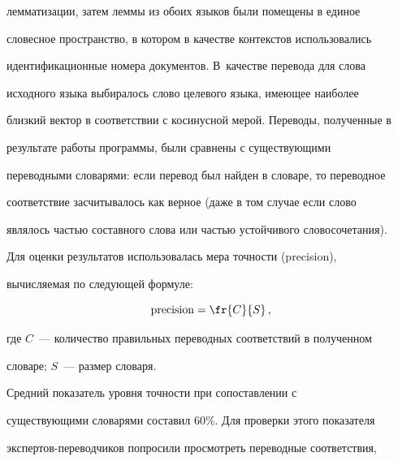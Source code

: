лемматизации, затем леммы из обоих языков были помещены в единое


словесное пространство, в котором в качестве контекстов использовались


идентификационные номера документов. В~качестве перевода для слова


исходного языка выбиралось слово целевого языка, име\-ющее наиболее


близкий вектор в соответствии с косинусной мерой. Переводы, полученные в


результате работы программы, были сравнены с существующими


переводными словарями: если перевод был найден в словаре, то переводное


соответствие засчитывалось как верное (даже в том случае если слово


являлось частью составного слова или частью устойчивого словосочетания).


Для оценки результатов использовалась мера точности (precision),


вычисляемая по следующей фор\-муле:








\vspace*{-3pt}





\noindent


     $$


     \mathrm{precision} =\fr{C}{S}\,,


     $$





     \vspace*{-3pt}





\noindent


где $C$~--- количество правильных переводных соответствий в полученном


словаре; $S$~--- размер словаря.





     Средний показатель уровня точности при сопоставлении с


существующими словарями составил 60\%. Для проверки этого показателя


экспертов-переводчиков попросили просмотреть переводные соответствия,


